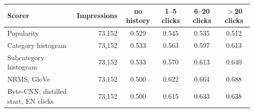 \begin{tabular}{lrcccc}
\toprule
Scorer & Impressions & no history & 1--5 clicks & 6--20 clicks & $>$20 clicks\\
\midrule
Popularity & 73,152 & 0.529 & 0.545 & 0.535 & 0.512\\
Category histogram & 73,152 & 0.533 & 0.563 & 0.597 & 0.613\\
Subcategory histogram & 73,152 & 0.533 & 0.570 & 0.613 & 0.640\\
NRMS, GloVe & 73,152 & 0.500 & 0.622 & 0.664 & 0.688\\
Byte-CNN, distilled start, EN clicks & 73,152 & 0.500 & 0.615 & 0.633 & 0.638\\
\bottomrule
\end{tabular}
